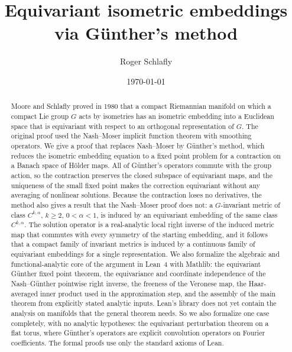 \documentclass[11pt]{amsart}
\title{Equivariant isometric embeddings via G\"unther's method}
\author{Roger Schlafly}
\date{\today}
\theoremstyle{definition}
\begin{document}
\begin{abstract}
Moore and Schlafly proved in 1980 that a compact Riemannian manifold on which a compact Lie group $G$
acts by isometries has an isometric embedding into a Euclidean space that is equivariant with respect
to an orthogonal representation of $G$. The original proof used the Nash--Moser implicit function
theorem with smoothing operators. We give a proof that replaces Nash--Moser by G\"unther's method,
which reduces the isometric embedding equation to a fixed point problem for a contraction on a
Banach space of H\"older maps. All of G\"unther's operators commute with the group action, so the
contraction preserves the closed subspace of equivariant maps, and the uniqueness of the small fixed
point makes the correction equivariant without any averaging of nonlinear solutions. Because the
contraction loses no derivatives, the method also gives a result that the Nash--Moser proof does
not: a $G$-invariant metric of class $C^{k,\alpha}$, $k\ge2$, $0<\alpha<1$, is induced by an
equivariant embedding of the same class $C^{k,\alpha}$. The solution operator is a real-analytic
local right inverse of the induced metric map that commutes with every symmetry of the starting
embedding, and it follows that a compact family of invariant metrics is induced by a continuous
family of equivariant embeddings for a single representation. We also
formalize the algebraic and functional-analytic core of the argument in Lean~4 with Mathlib:
the equivariant G\"unther fixed point theorem, the equivariance and coordinate independence of the
Nash--G\"unther pointwise right inverse, the freeness of the Veronese map, the Haar-averaged inner
product used in the approximation step, and the assembly of the main theorem from explicitly
stated analytic inputs. Lean's library does not yet contain the analysis on manifolds that the
general theorem needs. So we also formalize one case completely, with no analytic hypotheses:
the equivariant perturbation theorem on a flat torus, where G\"unther's operators are explicit
convolution operators on Fourier coefficients. The formal proofs use only the standard axioms of
Lean.
\end{abstract}


\maketitle
\end{document}
